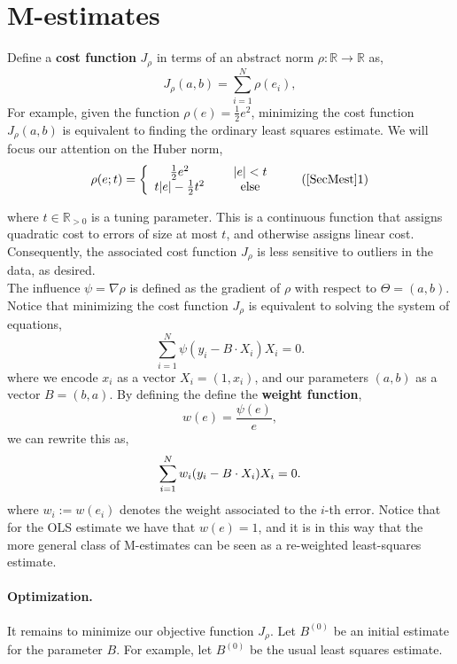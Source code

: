 \documentclass[11pt, a4 paper]{article}
\begin{document}
\section{M-estimates} \label{SecMest}
Define a \textbf{cost function} $J_\rho$  in terms of an abstract norm $\rho: \mathbb{R} \rightarrow \mathbb{R}$ as,
\[
J_\rho(a,b) = \sum_{i = 1}^N \rho(e_i),
\]
For example, given the function $\rho(e) = \frac{1}{2}{e^2}$, minimizing the cost function $J_\rho(a,b)$ is equivalent to finding the ordinary least squares estimate. We will focus our attention on the Huber norm,
\begin{equation} \label{EqHuber}
\rho(e; t) = \left\{\begin{array}{ccc}\frac{1}{2}e^2 & ~ & |e| < t \\t|e| - \frac{1}{2}t^2 & ~ & \mbox{else}\end{array}\right. \tag{\ref{SecMest}1}
\end{equation}



where $t\in\mathbb{R}_{>0}$ is a tuning parameter. This is a continuous function that assigns quadratic cost to errors of size at most $t$, and otherwise assigns linear cost. Consequently, the associated cost function $J_\rho$ is less sensitive to outliers in the data, as desired.\\


The influence $\psi = \nabla\rho$ is defined as the gradient of $\rho$ with respect to $\Theta = (a,b)$. Notice that minimizing the cost function $J_\rho$ is equivalent to solving the system of equations,
\[
\sum_{i = 1}^N \psi(y_i - B\cdot X_i)X_i = 0.
\]
where we encode $x_i$ as a vector $X_i = (1, x_i)$, and our parameters $(a,b)$ as a vector $B = (b, a)$. By defining the define the \textbf{weight function},
\[
w(e) = \frac{\psi(e)}{e},
\]
we can rewrite this as,
\begin{equation}
\sum_{i = 1}^N w_i(y_i - B\cdot X_i)X_i = 0. \notag
\end{equation}
where $w_i:= w(e_i)$ denotes the weight associated to the $i$-th error. Notice that for the OLS estimate we have that $w(e) = 1$, and it is in this way that the more general class of M-estimates can be seen as a re-weighted least-squares estimate.

\paragraph{Optimization.} It remains to minimize our objective function $J_\rho$. Let $B^{(0)}$ be an initial estimate for the parameter $B$. For example, let $B^{(0)}$ be the usual least squares estimate.\\
\end{document}

